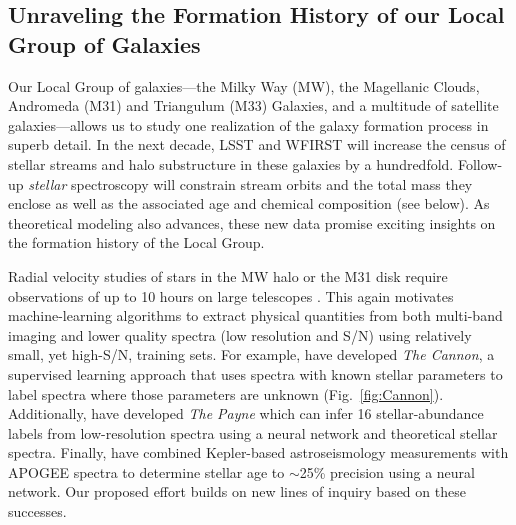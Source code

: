 
\subsection{Unraveling the Formation History of our Local Group of Galaxies}
\label{sec:localgroup}

Our Local Group of galaxies---the Milky Way (MW), the Magellanic Clouds,
Andromeda (M31) and Triangulum (M33) Galaxies, and a multitude of
satellite galaxies---allows us to study one realization of the galaxy
formation process in superb detail.  In the next decade, LSST and WFIRST
will increase the census of stellar streams and halo substructure in
these galaxies by a hundredfold.  Follow-up \emph{stellar} spectroscopy
will constrain stream orbits and the total mass they enclose
\citep{2017ApJ...836..234S} as well as the associated age and chemical
composition (see below).
As theoretical modeling also advances, these new data promise exciting
insights on the formation history of the Local Group.

Radial velocity studies of stars in the MW halo or the M31 disk require
observations of up to 10 hours on large telescopes
\citep[e.g.,][]{2018arXiv180904082C}.  This again motivates
machine-learning algorithms to extract physical quantities from both
multi-band imaging and lower quality spectra (low resolution and S/N)
using relatively small, yet high-S/N, training sets.  For example,
\citet{2015ApJ...808...16N} have developed {\it The Cannon}, a
supervised learning approach that uses spectra with known stellar
parameters to label spectra where those parameters are unknown
(Fig.~\ref{fig:Cannon}).  Additionally, \citet{2018arXiv180401530T} have
developed {\it The Payne} which can infer 16 stellar-abundance labels
from low-resolution spectra using a neural network and theoretical
stellar spectra.  Finally, \citet{2018arXiv180803278T} have combined
Kepler-based astroseismology measurements with APOGEE spectra to
determine stellar age to $\sim$25\% precision using a neural network.
Our proposed effort builds on new lines of inquiry based on these
successes.

